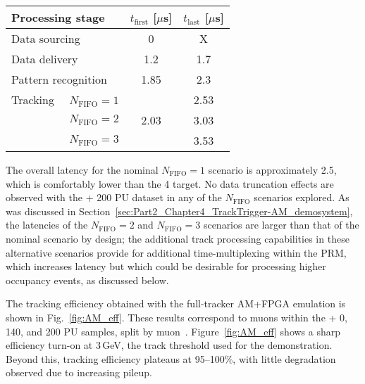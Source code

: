 \begin{table}[t]
\begin{center}
\label{tab:AMlatency}
\begin{tabular}{l|c|c}
  Processing stage & $t_{\text{first}}$ [$\mu$s] & $t_{\text{last}}$ [$\mu$s] \\
  \hline
  \hline
  Data sourcing & 0 & X  \\
  \hline
  Data delivery & 1.2 & 1.7 \\
  \hline
  Pattern recognition & 1.85 & 2.3 \\
  \hline
  Tracking  ~~$N_{\text{FIFO}}=1$ & \multirow{3}{*}{2.03} & 2.53 \\
  \cline{3-3}
  \multicolumn{1}{r|}{$N_{\text{FIFO}}=2$} &  & 3.03 \\
  \cline{3-3}
  \multicolumn{1}{r|}{$N_{\text{FIFO}}=3$} &  & 3.53 \\
  \hline
\end{tabular}
\end{center}
\end{table}

The overall latency for the nominal $N_{\text{FIFO}}=1$ scenario is approximately 2.5, which is comfortably lower than the 4 target. No data truncation effects are observed with the \ttbar + 200 PU dataset in any of the $N_{\text{FIFO}}$ scenarios explored. As was discussed in Section~\ref{sec:Part2_Chapter4_TrackTrigger-AM_demosystem}, the latencies of the $N_{\text{FIFO}}=2$ and $N_{\text{FIFO}}=3$ scenarios are larger than that of the nominal scenario by design; the additional track processing capabilities in these alternative scenarios provide for additional time-multiplexing within the PRM, which increases latency but which could be desirable for processing higher occupancy events, as discussed below.  

The tracking efficiency obtained with the full-tracker AM+FPGA emulation is shown in Fig.~\ref{fig:AM_eff}. These results correspond to muons within the \ttbar + 0, 140, and 200 PU samples, split by muon~\pt. Figure~\ref{fig:AM_eff} shows a sharp efficiency turn-on at 3\,GeV, the track \pt threshold used for the demonstration. Beyond this, tracking efficiency plateaus at 95--100\%, with little degradation observed due to increasing pileup.

